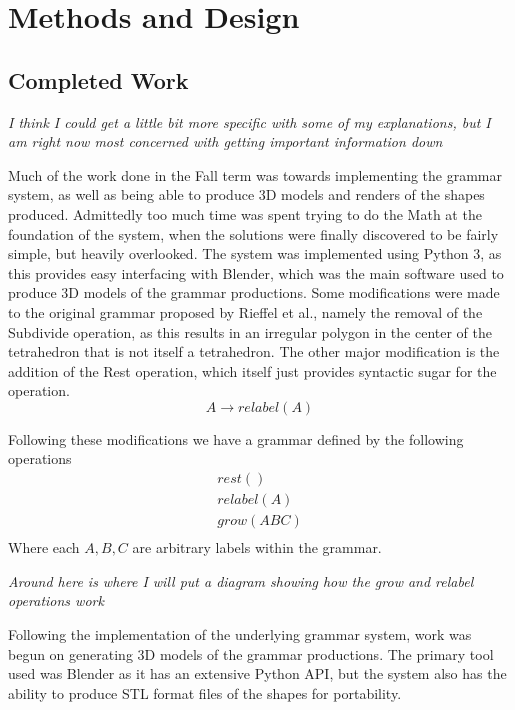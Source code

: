 \documentclass[condensed]{union-cs-thesis}
\begin{document}

\section{Methods and Design} \label{sec:work}


\subsection{Completed Work}

\emph{I think I could get a little bit more specific with some of my explanations, but I am right now most concerned with getting important information down}

\par
Much of the work done in the Fall term was towards implementing the grammar system, as well as being able to produce 3D models and renders of the shapes produced.  Admittedly too much time was spent trying to do the Math at the foundation of the system, when the solutions were finally discovered to be fairly simple, but heavily overlooked.  The system was implemented using Python 3, as this provides easy interfacing with Blender, which was the main software used to produce 3D models of the grammar productions.  Some modifications were made to the original grammar proposed by Rieffel et al., namely the removal of the Subdivide operation, as this results in an irregular polygon in the center of the tetrahedron that is not itself a tetrahedron.  The other major modification is the addition of the Rest operation, which itself just provides syntactic sugar for the operation.
\[A \to relabel(A)\]

\par
Following these modifications we have a grammar defined by the following operations
\begin{displaymath}
  \begin{matrix}
    rest()     \\
    relabel(A) \\
    grow(ABC)  \\
  \end{matrix}
\end{displaymath}
Where each $A,B,C$ are arbitrary labels within the grammar.

\emph{Around here is where I will put a diagram showing how the grow and relabel operations work}

\par
Following the implementation of the underlying grammar system, work was begun on generating 3D models of the grammar productions.  The primary tool used was Blender as it has an extensive Python API, but the system also has the ability to produce STL format files of the shapes for portability.
\end{document}

